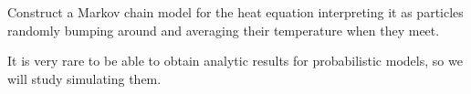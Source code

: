 \begin{slide}
\question

Construct a Markov chain model for the heat equation interpreting it as particles randomly bumping around and averaging their temperature when they meet.

	
\end{slide}




\begin{slide}
\begin{problem}
It is very rare to be able to obtain analytic results for probabilistic models, so we will study simulating them.
\end{problem}





	
\end{slide}

